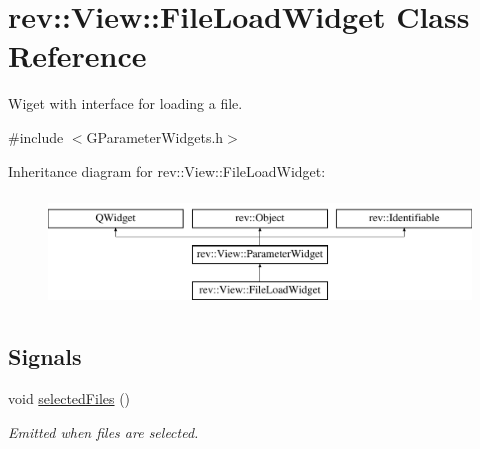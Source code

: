 \hypertarget{classrev_1_1_view_1_1_file_load_widget}{}\section{rev\+::View\+::File\+Load\+Widget Class Reference}
\label{classrev_1_1_view_1_1_file_load_widget}


Wiget with interface for loading a file.  




{\ttfamily \#include $<$G\+Parameter\+Widgets.\+h$>$}

Inheritance diagram for rev\+::View\+::File\+Load\+Widget\+:\begin{figure}[H]
\begin{center}
\leavevmode
\includegraphics[height=3.000000cm]{classrev_1_1_view_1_1_file_load_widget}
\end{center}
\end{figure}
\subsection*{Signals}
\begin{DoxyCompactItemize}
\item 
\mbox{\label{classrev_1_1_view_1_1_file_load_widget_a8134c4578c2662bd60bf988ae38bc3e0}} 
void \mbox{\hyperlink{classrev_1_1_view_1_1_file_load_widget_a8134c4578c2662bd60bf988ae38bc3e0}{selected\+Files}} ()
\begin{DoxyCompactList}\small\item\em Emitted when files are selected. \end{DoxyCompactList}\end{DoxyCompactItemize}
